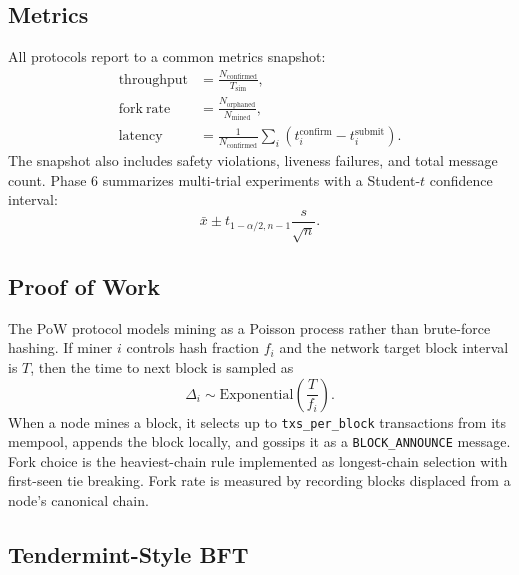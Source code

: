 \documentclass[11pt]{article}
\begin{document}
\subsection{Metrics}

All protocols report to a common metrics snapshot:
\begin{align}
  \mathrm{throughput} &= \frac{N_{\mathrm{confirmed}}}{T_{\mathrm{sim}}},\\
  \mathrm{fork\ rate} &= \frac{N_{\mathrm{orphaned}}}{N_{\mathrm{mined}}},\\
  \mathrm{latency} &= \frac{1}{N_{\mathrm{confirmed}}}\sum_i (t_i^{\mathrm{confirm}} - t_i^{\mathrm{submit}}).
\end{align}
The snapshot also includes safety violations, liveness failures, and total message count. Phase 6 summarizes multi-trial experiments with a Student-$t$ confidence interval:
\begin{equation}
  \bar{x} \pm t_{1-\alpha/2,n-1}\frac{s}{\sqrt{n}}.
\end{equation}

\subsection{Proof of Work}

The PoW protocol models mining as a Poisson process rather than brute-force hashing. If miner $i$ controls hash fraction $f_i$ and the network target block interval is $T$, then the time to next block is sampled as
\begin{equation}
  \Delta_i \sim \mathrm{Exponential}\left(\frac{T}{f_i}\right).
\end{equation}
When a node mines a block, it selects up to \texttt{txs\_per\_block} transactions from its mempool, appends the block locally, and gossips it as a \texttt{BLOCK\_ANNOUNCE} message. Fork choice is the heaviest-chain rule implemented as longest-chain selection with first-seen tie breaking. Fork rate is measured by recording blocks displaced from a node's canonical chain.

\subsection{Tendermint-Style BFT}
\end{document}

